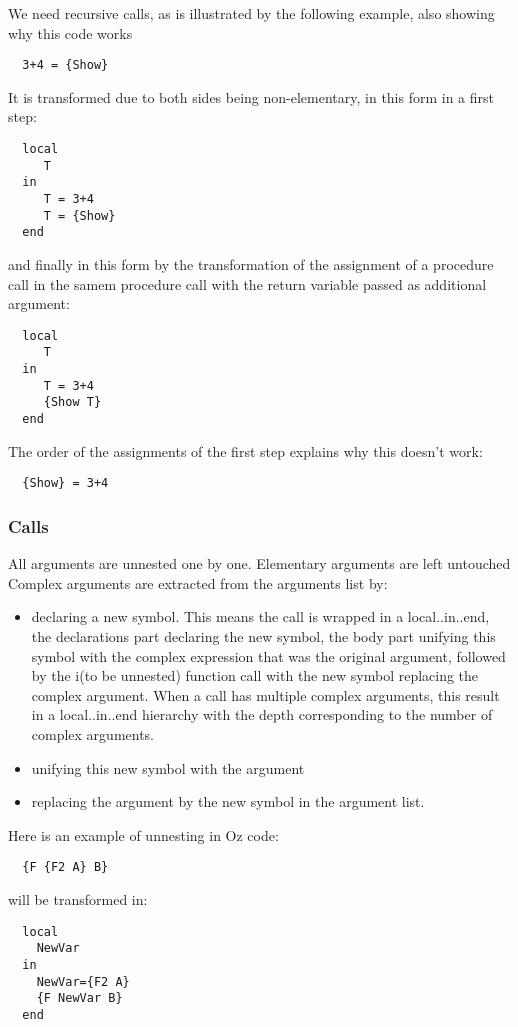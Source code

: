 \documentclass[a4paper]{memoir}
\begin{document}
\begin{description}
We need recursive calls, as is illustrated by the following example, also showing why this code works
\begin{lstlisting}
  3+4 = {Show}
\end{lstlisting}
It is transformed due to both sides being non-elementary, in this form in a first step:
\begin{lstlisting}
  local
     T
  in
     T = 3+4
     T = {Show}
  end
\end{lstlisting}
and finally in this form by the transformation of the assignment of a procedure call in the samem procedure call with the return variable passed as additional argument:
\begin{lstlisting}
  local
     T
  in
     T = 3+4
     {Show T}
  end
\end{lstlisting}
The order of the assignments of the first step explains why this doesn't work:
\begin{lstlisting}
  {Show} = 3+4
\end{lstlisting}

\end{description}
\subsubsection{Calls}\label{sec:unnester:calls}
All arguments are unnested one by one. Elementary arguments are left untouched
Complex arguments are extracted from the arguments list by:
\begin{itemize}
  \item declaring a new symbol. This means the call is wrapped in a local..in..end, the declarations part declaring the new symbol, the body part unifying this symbol with the complex expression that was the original argument, followed by the i(to be unnested) function call with the new symbol replacing the complex argument. When a call has multiple complex arguments, this result in a local..in..end hierarchy with the depth corresponding to the number of complex arguments.
  \item unifying this new symbol with the argument
  \item replacing the argument by the new symbol in the argument list.
\end{itemize}
Here is an example of unnesting in Oz code:
\begin{lstlisting}
  {F {F2 A} B}
\end{lstlisting}
will be transformed in:
\begin{lstlisting}
  local
    NewVar
  in
    NewVar={F2 A}
    {F NewVar B}
  end
\end{lstlisting}
\end{document}
